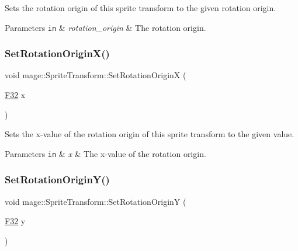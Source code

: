Sets the rotation origin of this sprite transform to the given rotation origin.


\begin{DoxyParams}[1]{Parameters}
\mbox{\tt in}  & {\em rotation\+\_\+origin} & The rotation origin. \\
\hline
\end{DoxyParams}
\hypertarget{structmage_1_1_sprite_transform_a1928602ce38aa2ebf26becd93c875dc5}{}\label{structmage_1_1_sprite_transform_a1928602ce38aa2ebf26becd93c875dc5} 
\subsubsection{\texorpdfstring{Set\+Rotation\+Origin\+X()}{SetRotationOriginX()}}
{\footnotesize\ttfamily void mage\+::\+Sprite\+Transform\+::\+Set\+Rotation\+OriginX (\begin{DoxyParamCaption}\item[{\hyperlink{namespacemage_aa97e833b45f06d60a0a9c4fc22ae02c0}{F32}}]{x }\end{DoxyParamCaption})\hspace{0.3cm}{\ttfamily [noexcept]}}

Sets the x-\/value of the rotation origin of this sprite transform to the given value.


\begin{DoxyParams}[1]{Parameters}
\mbox{\tt in}  & {\em x} & The x-\/value of the rotation origin. \\
\hline
\end{DoxyParams}
\hypertarget{structmage_1_1_sprite_transform_a8ccfaf7282419ed636cc97f911472604}{}\label{structmage_1_1_sprite_transform_a8ccfaf7282419ed636cc97f911472604} 
\subsubsection{\texorpdfstring{Set\+Rotation\+Origin\+Y()}{SetRotationOriginY()}}
{\footnotesize\ttfamily void mage\+::\+Sprite\+Transform\+::\+Set\+Rotation\+OriginY (\begin{DoxyParamCaption}\item[{\hyperlink{namespacemage_aa97e833b45f06d60a0a9c4fc22ae02c0}{F32}}]{y }\end{DoxyParamCaption})\hspace{0.3cm}{\ttfamily [noexcept]}}

